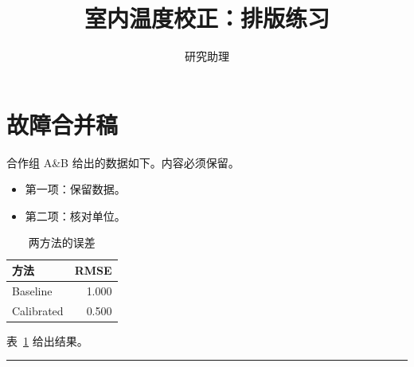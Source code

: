 \documentclass[UTF8,fontset=fandol,a4paper,11pt]{ctexart}
\title{室内温度校正：排版练习}
\author{研究助理}
\date{}
\begin{document}
\maketitle
\section{故障合并稿}\label{sec:rescue}
合作组 A\&B 给出的数据如下。内容必须保留。
\begin{itemize}\item 第一项：保留数据。\item 第二项：核对单位。\end{itemize}
\begin{table}[htbp]\centering
\caption{两方法的误差}\label{tab:results}
\begin{tabular}{lr}\toprule 方法 & RMSE\\\midrule
Baseline & 1.000\\Calibrated & 0.500\\\bottomrule\end{tabular}
\end{table}
表~\ref{tab:results} 给出结果。

\noindent\rule{0.9\linewidth}{2pt}
\end{document}

